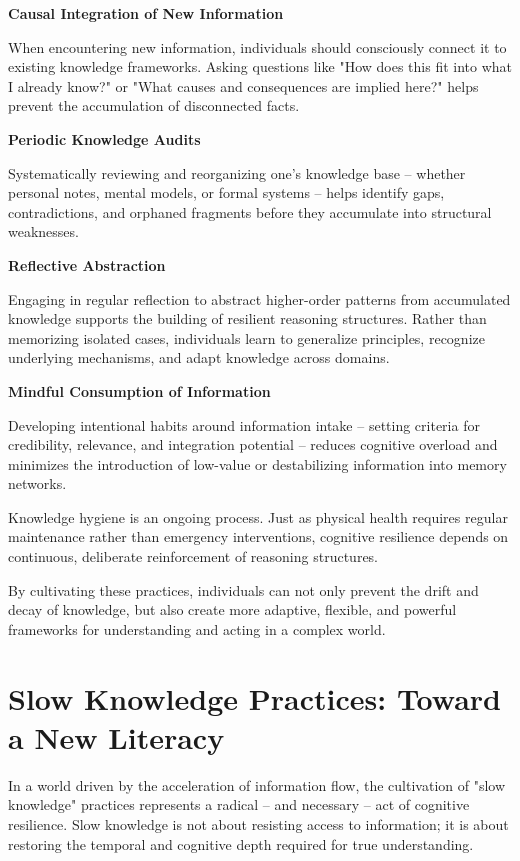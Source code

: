\textbf{Causal Integration of New Information}

When encountering new information, individuals should consciously
connect it to existing knowledge frameworks. Asking questions like "How
does this fit into what I already know?" or "What causes and
consequences are implied here?" helps prevent the accumulation of
disconnected facts.

\textbf{Periodic Knowledge Audits}

Systematically reviewing and reorganizing one's knowledge base -- whether
personal notes, mental models, or formal systems -- helps identify gaps,
contradictions, and orphaned fragments before they accumulate into
structural weaknesses.

\textbf{Reflective Abstraction}

Engaging in regular reflection to abstract higher-order patterns from
accumulated knowledge supports the building of resilient reasoning
structures. Rather than memorizing isolated cases, individuals learn to
generalize principles, recognize underlying mechanisms, and adapt
knowledge across domains.

\textbf{Mindful Consumption of Information}

Developing intentional habits around information intake -- setting
criteria for credibility, relevance, and integration potential -- reduces
cognitive overload and minimizes the introduction of low-value or
destabilizing information into memory networks.

Knowledge hygiene is an ongoing process. Just as physical health
requires regular maintenance rather than emergency interventions,
cognitive resilience depends on continuous, deliberate reinforcement of
reasoning structures.

By cultivating these practices, individuals can not only prevent the
drift and decay of knowledge, but also create more adaptive, flexible,
and powerful frameworks for understanding and acting in a complex world.


\section{Slow Knowledge Practices: Toward a New Literacy}

In a world driven by the acceleration of information flow, the
cultivation of "slow knowledge" practices represents a radical -- and
necessary -- act of cognitive resilience. Slow knowledge is not about
resisting access to information; it is about restoring the temporal and
cognitive depth required for true understanding.

